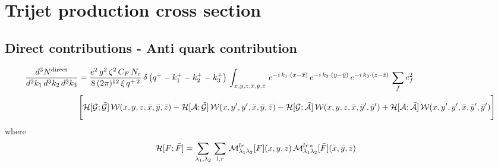 \documentclass[9pt]{article}
\numberwithin{equation}{section}
\begin{document}
\section{Trijet production cross section}
\subsection{Direct contributions - Anti quark contribution}
\begin{align}
     \frac{d^{3}N^{\text{direct}}}{d^{3}k_{1}\,d^{3}k_{2}\, d^{3}k_{3}} & = \frac{e^{2}\,g^{2}\,\zeta^{2}\,C_{F}\,N_{c}}{8\, (2\pi)^{12}\,\xi\,q^{+\,2}}\, \delta\left(q^{+}-k^{+}_{1}-k^{+}_{2}-k^{+}_{3}\right)\, \int_{x,y,z,\Bar{x},\Bar{y},\Bar{z}}\, e^{-i\,k_{1}\cdot (x-\Bar{x})}\, e^{-i\,k_{2}\cdot (y-\Bar{y})}\, e^{-i\,k_{3}\cdot (z-\Bar{z})}\,\sum_{f}e^{2}_{f}\notag \\ & \Bigg[\mathcal{H}[\mathcal{G};\mathcal{\Bar{G}}]\,\mathcal{W}(x,y,z,\Bar{x},\Bar{y},\Bar{z})-\mathcal{H}[\mathcal{A};\mathcal{\Bar{G}}]\,\mathcal{W}(x,y',y',\Bar{x},\Bar{y},\Bar{z})-\mathcal{H}[\mathcal{G};\mathcal{\Bar{A}}]\,\mathcal{W}(x,y,z,\Bar{x},\Bar{y}',\Bar{y}')+\mathcal{H}[\mathcal{A};\mathcal{\Bar{A}}]\,\mathcal{W}(x,y',y',\Bar{x},\Bar{y}',\Bar{y}')\Bigg]
\end{align}
where
\begin{align}
    \mathcal{H}[F;\Bar{F}] & = \sum_{\lambda_{1},\lambda_{2}}\,\sum_{l,r}\, \mathcal{M}^{lr}_{\lambda_{1}\lambda_{2}}[F](x,y,z)\,\mathcal{M}^{lr\,*}_{\lambda_{1}\lambda_{2}}[\Bar{F}](\Bar{x},\Bar{y},\Bar{z})
\end{align}
\end{document}
